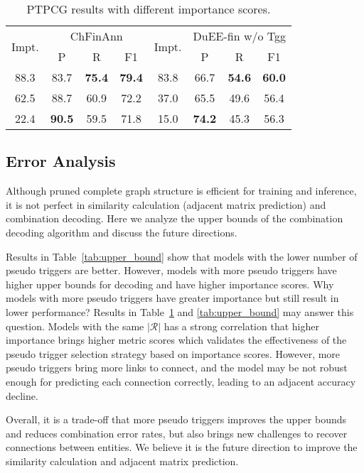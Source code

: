 \begin{table}[t]
    \centering
    \small
    \begin{tabular}{cccccccc}
        \toprule
        \multirow{2}{*}{Impt.} & \multicolumn{3}{c}{ChFinAnn} & \multirow{2}{*}{Impt.} & \multicolumn{3}{c}{DuEE-fin w/o Tgg}\\
        \cmidrule(lr){2-4}\cmidrule(lr){6-8}
        & P & R & F1 & & P & R & F1 \\
        \cmidrule(lr){1-4}\cmidrule(lr){5-8}
        88.3 & 83.7 & \textbf{75.4} & \textbf{79.4} & 83.8 & 66.7 & \textbf{54.6} & \textbf{60.0} \\
        62.5 & 88.7 & 60.9 & 72.2 & 37.0 & 65.5 & 49.6 & 56.4 \\
        22.4 & \textbf{90.5} & 59.5 & 71.8 & 15.0 & \textbf{74.2} & 45.3 & 56.3 \\
        \bottomrule
    \end{tabular}
    \caption{PTPCG results with different importance scores.}
    \label{tab:importance_validation}
\end{table}


\subsection{Error Analysis}\label{sec:err_analyze}

Although pruned complete graph structure is efficient for training and inference, it is not perfect in similarity calculation (adjacent matrix prediction) and combination decoding.
Here we analyze the upper bounds of the combination decoding algorithm and discuss the future directions.

Results in Table~\ref{tab:upper_bound} show that models with the lower number of pseudo triggers are better.
However, models with more pseudo triggers have higher upper bounds for decoding and have higher importance scores.
Why models with more pseudo triggers have greater importance but still result in lower performance?
Results in Table~\ref{tab:importance_validation} and \ref{tab:upper_bound} may answer this question.
Models with the same $|\mathcal{R}|$ has a strong correlation that higher importance brings higher metric scores which validates the effectiveness of the pseudo trigger selection strategy based on importance scores.
However, more pseudo triggers bring more links to connect, and the model may be not robust enough for predicting each connection correctly, leading to an adjacent accuracy decline.

Overall, it is a trade-off that more pseudo triggers improves the upper bounds and reduces combination error rates, but also brings new challenges to recover connections between entities.
We believe it is the future direction to improve the similarity calculation and adjacent matrix prediction.

